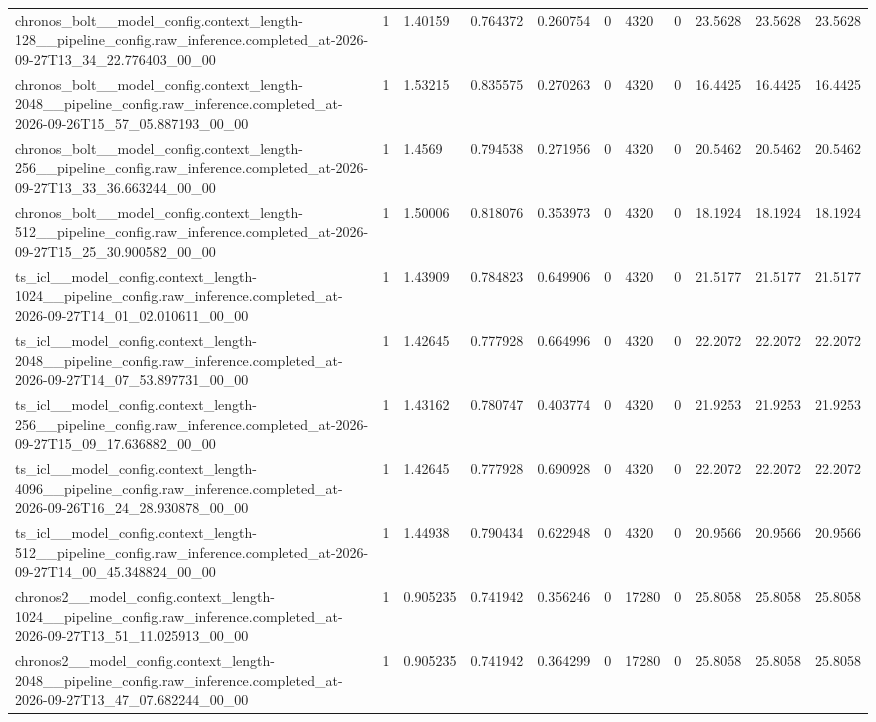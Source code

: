 \begin{tabular}{lllllllllll}
chronos\_bolt\_\_model\_config.context\_length-128\_\_pipeline\_config.raw\_inference.completed\_at-2026-09-27T13\_34\_22.776403\_00\_00 & 1 & 1.40159 & 0.764372 & 0.260754 & 0 & 4320 & 0 & 23.5628 & 23.5628 & 23.5628 \\
chronos\_bolt\_\_model\_config.context\_length-2048\_\_pipeline\_config.raw\_inference.completed\_at-2026-09-26T15\_57\_05.887193\_00\_00 & 1 & 1.53215 & 0.835575 & 0.270263 & 0 & 4320 & 0 & 16.4425 & 16.4425 & 16.4425 \\
chronos\_bolt\_\_model\_config.context\_length-256\_\_pipeline\_config.raw\_inference.completed\_at-2026-09-27T13\_33\_36.663244\_00\_00 & 1 & 1.4569 & 0.794538 & 0.271956 & 0 & 4320 & 0 & 20.5462 & 20.5462 & 20.5462 \\
chronos\_bolt\_\_model\_config.context\_length-512\_\_pipeline\_config.raw\_inference.completed\_at-2026-09-27T15\_25\_30.900582\_00\_00 & 1 & 1.50006 & 0.818076 & 0.353973 & 0 & 4320 & 0 & 18.1924 & 18.1924 & 18.1924 \\
ts\_icl\_\_model\_config.context\_length-1024\_\_pipeline\_config.raw\_inference.completed\_at-2026-09-27T14\_01\_02.010611\_00\_00 & 1 & 1.43909 & 0.784823 & 0.649906 & 0 & 4320 & 0 & 21.5177 & 21.5177 & 21.5177 \\
ts\_icl\_\_model\_config.context\_length-2048\_\_pipeline\_config.raw\_inference.completed\_at-2026-09-27T14\_07\_53.897731\_00\_00 & 1 & 1.42645 & 0.777928 & 0.664996 & 0 & 4320 & 0 & 22.2072 & 22.2072 & 22.2072 \\
ts\_icl\_\_model\_config.context\_length-256\_\_pipeline\_config.raw\_inference.completed\_at-2026-09-27T15\_09\_17.636882\_00\_00 & 1 & 1.43162 & 0.780747 & 0.403774 & 0 & 4320 & 0 & 21.9253 & 21.9253 & 21.9253 \\
ts\_icl\_\_model\_config.context\_length-4096\_\_pipeline\_config.raw\_inference.completed\_at-2026-09-26T16\_24\_28.930878\_00\_00 & 1 & 1.42645 & 0.777928 & 0.690928 & 0 & 4320 & 0 & 22.2072 & 22.2072 & 22.2072 \\
ts\_icl\_\_model\_config.context\_length-512\_\_pipeline\_config.raw\_inference.completed\_at-2026-09-27T14\_00\_45.348824\_00\_00 & 1 & 1.44938 & 0.790434 & 0.622948 & 0 & 4320 & 0 & 20.9566 & 20.9566 & 20.9566 \\
chronos2\_\_model\_config.context\_length-1024\_\_pipeline\_config.raw\_inference.completed\_at-2026-09-27T13\_51\_11.025913\_00\_00 & 1 & 0.905235 & 0.741942 & 0.356246 & 0 & 17280 & 0 & 25.8058 & 25.8058 & 25.8058 \\
chronos2\_\_model\_config.context\_length-2048\_\_pipeline\_config.raw\_inference.completed\_at-2026-09-27T13\_47\_07.682244\_00\_00 & 1 & 0.905235 & 0.741942 & 0.364299 & 0 & 17280 & 0 & 25.8058 & 25.8058 & 25.8058 \\

\end{tabular}
